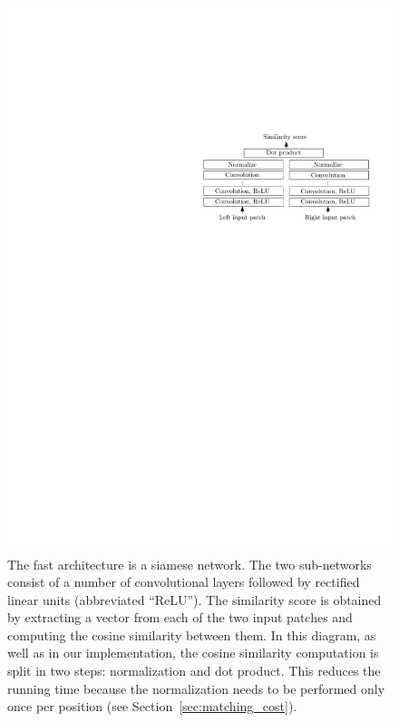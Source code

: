 \documentclass[twoside,11pt]{article}
\begin{document}
\begin{figure}[tb]
\begin{center}
\includegraphics{img/architecture_fast.pdf}
\end{center}
\caption{The fast architecture is a siamese network. The two sub-networks
consist of a number of convolutional layers followed by rectified linear units
(abbreviated ``ReLU''). The similarity score is obtained by extracting a vector
from each of the two input patches and computing the cosine similarity between
them. In this diagram, as well as in our implementation, the cosine similarity
computation is split in two steps: normalization and dot product. This reduces
the running time because the normalization needs to be performed only once per
position (see Section~\ref{sec:matching_cost}).}

\label{fig:architecture_fast}
\end{figure}
\end{document}
